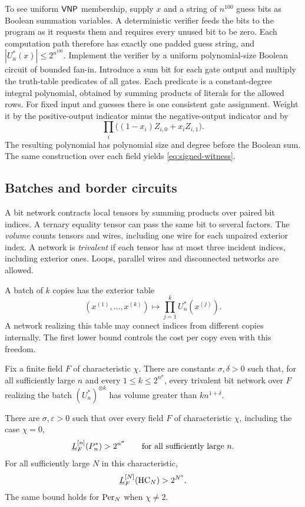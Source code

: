 To see uniform $\mathsf{VNP}$ membership, supply $x$ and a string of $n^{100}$
guess bits as Boolean summation variables. A deterministic verifier
feeds the bits to the program as it requests them and requires every
unused bit to be zero. Each computation path therefore has exactly
one padded guess string, and $|U_n^*(x)|\le 2^{n^{100}}$. Implement
the verifier by a uniform polynomial-size Boolean circuit of bounded
fan-in. Introduce a sum bit for each gate output and multiply the
truth-table predicates of all gates. Each predicate is a
constant-degree integral polynomial, obtained by summing products of
literals for the allowed rows. For fixed input and guesses there is
one consistent gate assignment. Weight it by the positive-output
indicator minus the negative-output indicator and by
\[
                 \prod_i\big((1-x_i)Z_{i,0}+x_i Z_{i,1}\big).
\]
The resulting polynomial has polynomial size and degree before the
Boolean sum. The same construction over each field yields
\eqref{eq:signed-witness}.

\subsection{Batches and border circuits}

A bit network contracts local tensors by summing products over paired
bit indices. A ternary equality tensor can pass the same bit to
several factors. The \emph{volume} counts tensors and wires, including
one wire for each unpaired exterior index. A network is
\emph{trivalent} if each tensor has at most three incident indices,
including exterior ones. Loops, parallel wires and disconnected
networks are allowed.

A batch of $k$ copies has the exterior table
\[
        (x^{(1)},\ldots,x^{(k)})\longmapsto
              \prod_{j=1}^k U_n^*(x^{(j)}).
\]
A network realizing this table may connect indices from different
copies internally. The first lower bound controls the cost per copy
even with this freedom.

\begin{theorem}\label{thm:batches}
Fix a finite field $F$ of characteristic $\chi$.
There are constants $\sigma,\delta>0$ such that, for all sufficiently
large $n$ and every $1\le k\le 2^{n^\sigma}$, every trivalent bit
network over $F$ realizing the batch $(U_n^*)^{\otimes k}$ has
volume greater than $kn^{1+\delta}$.
\end{theorem}

\begin{theorem}\label{thm:stretch}
There are $\sigma,\varepsilon>0$ such that over every field $F$ of
characteristic $\chi$, including the case $\chi=0$,
\[
   \underline L_F^{[n]}(P_n^*)>2^{n^\sigma}
       \qquad\text{for all sufficiently large }n .
\]
For all sufficiently large $N$ in this characteristic,
\[
   \underline L_F^{[N]}(\mathrm{HC}_N)>2^{N^\varepsilon}.
\]
The same bound holds for $\mathrm{Per}_N$ when $\chi\ne2$.
\end{theorem}

